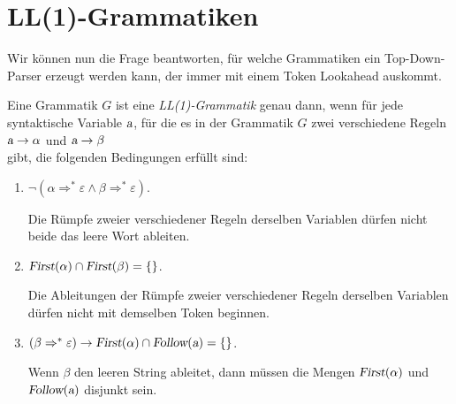 \section{LL(1)-Grammatiken}
Wir k\"onnen nun die Frage beantworten, f\"ur welche Grammatiken ein Top-Down-Parser erzeugt
werden kann, der immer mit einem Token Lookahead auskommt.  

\begin{Definition}[LL(1)-Grammatik]
Eine Grammatik $G$ ist eine \emph{LL(1)-Grammatik} genau dann, wenn f\"ur jede syntaktische Variable
$\textsl{a}$, f\"ur die es in der Grammatik $G$ zwei verschiedene Regeln
\\[0.2cm]
\hspace*{1.3cm}
$\textsl{a} \rightarrow \alpha$ \quad und \quad $\textsl{a} \rightarrow \beta$ 
\\[0.2cm]
gibt, die folgenden Bedingungen erf\"ullt sind:
\begin{enumerate}
\item $\neg( \alpha \Rightarrow^* \varepsilon \wedge \beta \Rightarrow^* \varepsilon)$.

      Die R\"umpfe zweier verschiedener Regeln derselben Variablen
      d\"urfen nicht beide das leere Wort ableiten.
\item $\textsl{First}(\alpha) \cap \textsl{First}(\beta) = \{\}$.

      Die Ableitungen der R\"umpfe zweier verschiedener Regeln derselben Variablen
      d\"urfen nicht mit demselben Token beginnen.
\item   $(\beta  \Rightarrow^* \varepsilon) \rightarrow \textsl{First}(\alpha) \cap
\textsl{Follow}(\textsl{a}) = \{\}$.

      Wenn $\beta$ den leeren String ableitet, dann m\"ussen die Mengen
      $\textsl{First}(\alpha)$ und $\textsl{Follow}(\textsl{a})$ disjunkt sein.  
      \eox
\end{enumerate}
\end{Definition}

